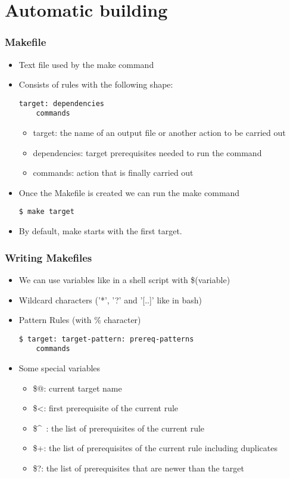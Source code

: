 \section{Automatic building}

\begin{frame}[fragile]
  \frametitle{Makefile}

  \begin{itemize}
  \item Text file used by the make command
  \item Consists of rules with the following shape:
\begin{verbatim}
target: dependencies
    commands
\end{verbatim}

    \begin{itemize}
    \item target: the name of an output file or another action to be
      carried out
    \item dependencies: target prerequisites needed to run the command
    \item commands: action that is finally carried out
    \end{itemize}

  \item Once the Makefile is created we can run the make command
\begin{verbatim}
$ make target
\end{verbatim}
  \item By default, make starts with the first target. 
  \end{itemize}
\end{frame}

\begin{frame}[fragile]
  \frametitle{Writing Makefiles}
  \begin{itemize}
  \item We can use variables like in a shell script with \$(variable)
  \item Wildcard characters ('*', '?' and '[..]' like in bash)
  \item Pattern Rules (with \% character)
\begin{verbatim}
$ target: target-pattern: prereq-patterns
    commands
\end{verbatim}
  \item Some special variables
    \begin{itemize}
    \item \$@: current target name
    \item \$<: first prerequisite of the current rule
    \item \$\^~: the list of prerequisites of the current rule
    \item \$+: the list of prerequisites of the current rule including
      duplicates
    \item \$?: the list of prerequisites that are newer than the target
    \end{itemize}

  \end{itemize}
\end{frame}

